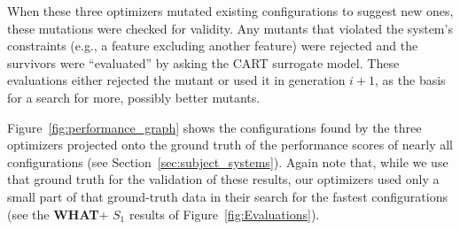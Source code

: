 \documentclass[smallextended]{svjour3}       %
\newcommand{\fig}[1]{Figure~\ref{fig:#1}}
\newcommand{\what}{{\bf WHAT}\xspace}
\begin{document}
When these three optimizers mutated existing configurations to suggest new ones,
these mutations were checked for validity. Any mutants that violated the system's constraints (e.g., a feature excluding another feature) were rejected
and the survivors were ``evaluated'' by asking the CART surrogate model.
These evaluations either rejected the mutant or used it in generation $i+1$, as the basis for a search for more, possibly
better  mutants.




\fig{performance_graph} shows the configurations found by the three optimizers projected onto the ground truth of the performance scores of nearly
all configurations (see Section~\ref{sec:subject_systems}). Again note that, while we use that ground truth for the validation of these results, our optimizers 
used only a small part of that ground-truth data in their search for the fastest configurations (see the \what + $S_1$
results of \fig{Evaluations}).
\end{document}
